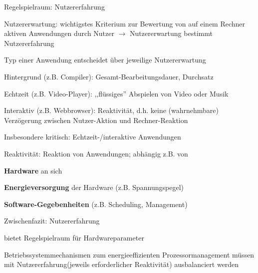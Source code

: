 \documentclass[a4paper]{article}
\begin{document}
\begin{multicols}{3}
    Regelspielraum: Nutzererfahrung
    \begin{itemize*}
        \item Nutzererwartung: wichtigstes Kriterium zur Bewertung von auf einem Rechner aktiven Anwendungen durch Nutzer $\rightarrow$ Nutzererwartung bestimmt Nutzererfahrung
        \item Typ einer Anwendung entscheidet über jeweilige Nutzererwartung
        \begin{enumerate*}
            \item Hintergrund (z.B. Compiler): Gesamt-Bearbeitungsdauer, Durchsatz
            \item Echtzeit (z.B. Video-Player): ,,flüssiges'' Abspielen von Video oder Musik
            \item Interaktiv (z.B. Webbrowser): Reaktivität, d.h. keine (wahrnehmbare) Verzögerung zwischen Nutzer-Aktion und Rechner-Reaktion
        \end{enumerate*}
        \item Insbesondere kritisch: Echtzeit-/interaktive Anwendungen
        \item Reaktivität: Reaktion von Anwendungen; abhängig z.B. von
        \begin{enumerate*}
            \item \textbf{Hardware} an sich
            \item \textbf{Energieversorgung} der Hardware (z.B. Spannungspegel)
            \item \textbf{Software-Gegebenheiten} (z.B. Scheduling, Management)
        \end{enumerate*}
        \item Zwischenfazit: Nutzererfahrung
        \begin{itemize*}
            \item bietet Regelspielraum für Hardwareparameter
            \item Betriebssystemmechanismen zum energieeffizienten Prozessormanagement  müssen mit Nutzererfahrung(jeweils erforderlicher Reaktivität)
            ausbalanciert werden
        \end{itemize*}
    \end{itemize*}


\end{multicols}
\end{document}
